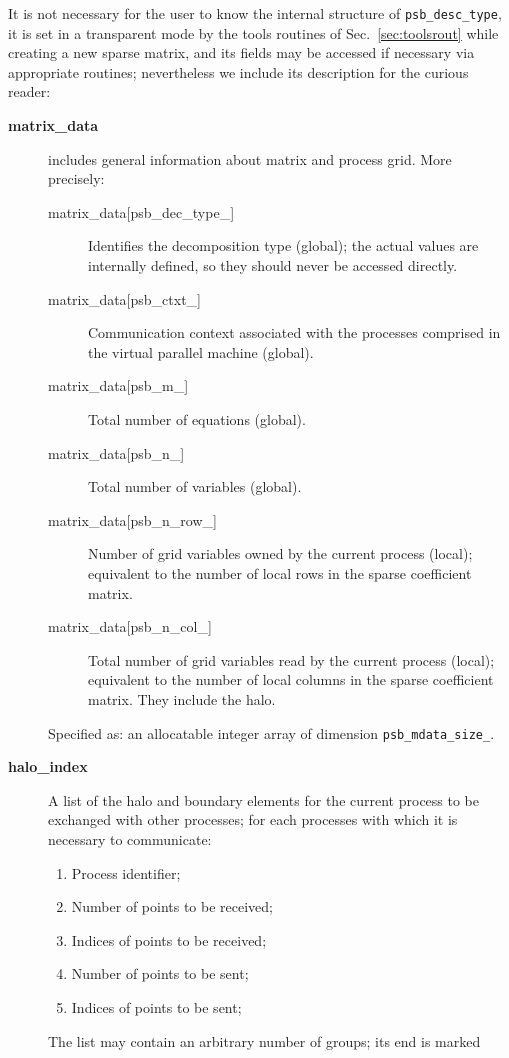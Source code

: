 It is not necessary for the user to know the internal structure of
\verb|psb_desc_type|, it is set in a transparent mode by the tools
routines of Sec.~\ref{sec:toolsrout} while creating a new sparse
matrix, and its fields may be accessed if necessary via appropriate
routines; nevertheless we include its description for the curious
reader:   
\begin{description}
\item[{\bf matrix\_data}] includes general information about matrix and
process grid. More precisely:
\begin{description}
\item[matrix\_data[psb\_dec\_type\_\hbox{]}] Identifies the decomposition type
(global); the actual values are internally defined, so they should
never be accessed directly.
\item[matrix\_data[psb\_ctxt\_\hbox{]}] Communication context
  associated with the processes comprised in the virtual parallel
  machine (global).
\item[matrix\_data[psb\_m\_\hbox{]}] Total number of equations (global).
\item[matrix\_data[psb\_n\_\hbox{]}] Total number of variables (global).
\item[matrix\_data[psb\_n\_row\_\hbox{]}] Number of grid variables owned by the
current process (local); equivalent to the number of local rows in the
sparse coefficient matrix.
\item[matrix\_data[psb\_n\_col\_\hbox{]}] Total number of grid variables read by the
current process (local); equivalent to the number of local columns in
the sparse coefficient matrix. They include the halo.
\end{description}
Specified as: an allocatable integer array of dimension \verb|psb_mdata_size_|.
\item[{\bf halo\_index}] A list of the halo and boundary elements for
the current process to be exchanged with other processes; for each
processes with which it is necessary to communicate:
\begin{enumerate}
\item Process identifier;
\item Number of points to be received;
\item Indices of points to be received;
\item Number of points to be sent;
\item Indices of points to be sent;
\end{enumerate}
The list may contain an arbitrary number of groups; its end is marked

\end{description}
